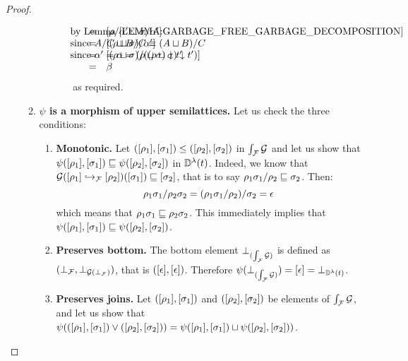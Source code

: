 \begin{proof}
\begin{enumerate}
\begin{enumerate}
\begin{enumerate}
\begin{enumerate}
\[\begin{array}{rcll}
                & = &
                     \cls{\redseq/\alpha' \sqcup \redseqtwo/\alpha'}
                     &\hspace{-5cm}\text{by \rlem{garbage_free_garbage_decomposition}} \\
                & = &
                     \cls{(\redseq \sqcup \redseqtwo)/\alpha'}
                     &\hspace{-5cm}\text{since $A/C \sqcup B/C \permeq (A \sqcup B)/C$} \\
                & = &
                     \cls{(\redseq \sqcup \redseqtwo)/((\redseq \sqcup \redseqtwo) \sieve \tm')}
                     &\hspace{-5cm}\text{since $\alpha' = \alpha = (\redseq \sqcup \redseqtwo) \sieve \tm'$} \\
                & = & \beta \\
          \end{array}
        \]
        as required. 
      \end{enumerate}
    \end{enumerate}
  \item {\bf $\psi$ is a morphism of upper semilattices.}
    Let us check the three conditions:
    \begin{enumerate}
    \item {\bf Monotonic.}
      Let $(\cls{\redseq_1},\cls{\redseqtwo_1}) \leq (\cls{\redseq_2},\cls{\redseqtwo_2})$ in $\grothy{\ulbF}{\ulbG}$
      and let us show that
      $\psi(\cls{\redseq_1},\cls{\redseqtwo_1}) \permle \psi(\cls{\redseq_2},\cls{\redseqtwo_2})$
      in $\ulbDerivLam{\tm}$.
      Indeed, we know that $\ulbG(\ptF{\cls{\redseq_2}}{\cls{\redseq_1}})(\cls{\redseqtwo_1}) \permle \cls{\redseqtwo_2}$,
      that is to say $\redseq_1\redseqtwo_1/\redseq_2 \permle \redseqtwo_2$.
      Then:
      \[
        \redseq_1\redseqtwo_1/\redseq_2\redseqtwo_2
        = (\redseq_1\redseqtwo_1/\redseq_2)/\redseqtwo_2
        = \emptyDerivation
      \]
      which means that $\redseq_1\redseqtwo_1 \permle \redseq_2\redseqtwo_2$.
      This immediately implies that
      $\psi(\cls{\redseq_1},\cls{\redseqtwo_1}) \permle \psi(\cls{\redseq_2},\cls{\redseqtwo_2})$.
    \item {\bf Preserves bottom.}
      The bottom element $\bot_{(\grothy{\ulbF}{\ulbG})}$
      is defined as $(\bot_\ulbF, \bot_{\ulbG(\bot_\ulbF)})$, that is
      $(\cls{\emptyDerivation}, \cls{\emptyDerivation})$.
      Therefore $\psi(\bot_{(\grothy{\ulbF}{\ulbG})}) = \cls{\emptyDerivation} = \bot_{\ulbDerivLam{\tm}}$.
    \item {\bf Preserves joins.}
      Let $(\cls{\redseq_1},\cls{\redseqtwo_1})$ and $(\cls{\redseq_2},\cls{\redseqtwo_2})$
      be elements of $\grothy{\ulbF}{\ulbG}$, and let us show that
      $\psi((\cls{\redseq_1},\cls{\redseqtwo_1}) \lor (\cls{\redseq_2},\cls{\redseqtwo_2})) =
       \psi(\cls{\redseq_1},\cls{\redseqtwo_1}) \sqcup \psi(\cls{\redseq_2},\cls{\redseqtwo_2}))$.


\end{enumerate}
\end{enumerate}
\end{enumerate}
\end{proof}
